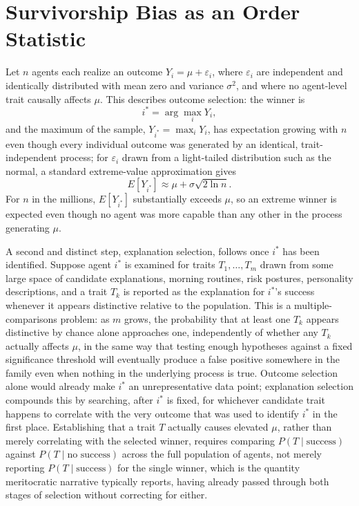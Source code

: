 \documentclass[11pt]{article}
\begin{document}
\section{Survivorship Bias as an Order Statistic}

Let $n$ agents each realize an outcome $Y_i = \mu + \varepsilon_i$, where $\varepsilon_i$ are independent and identically distributed with mean zero and variance $\sigma^2$, and where no agent-level trait causally affects $\mu$. This describes outcome selection: the winner is
\[
i^{*} = \arg\max_i Y_i,
\]
and the maximum of the sample, $Y_{i^{*}} = \max_i Y_i$, has expectation growing with $n$ even though every individual outcome was generated by an identical, trait-independent process; for $\varepsilon_i$ drawn from a light-tailed distribution such as the normal, a standard extreme-value approximation gives
\[
E[Y_{i^{*}}] \approx \mu + \sigma \sqrt{2 \ln n}.
\]
For $n$ in the millions, $E[Y_{i^{*}}]$ substantially exceeds $\mu$, so an extreme winner is expected even though no agent was more capable than any other in the process generating $\mu$.

A second and distinct step, explanation selection, follows once $i^{*}$ has been identified. Suppose agent $i^{*}$ is examined for traits $T_1, \dots, T_m$ drawn from some large space of candidate explanations, morning routines, risk postures, personality descriptions, and a trait $T_k$ is reported as the explanation for $i^{*}$'s success whenever it appears distinctive relative to the population. This is a multiple-comparisons problem: as $m$ grows, the probability that at least one $T_k$ appears distinctive by chance alone approaches one, independently of whether any $T_k$ actually affects $\mu$, in the same way that testing enough hypotheses against a fixed significance threshold will eventually produce a false positive somewhere in the family even when nothing in the underlying process is true. Outcome selection alone would already make $i^{*}$ an unrepresentative data point; explanation selection compounds this by searching, after $i^{*}$ is fixed, for whichever candidate trait happens to correlate with the very outcome that was used to identify $i^{*}$ in the first place. Establishing that a trait $T$ actually causes elevated $\mu$, rather than merely correlating with the selected winner, requires comparing $P(T \mid \text{success})$ against $P(T \mid \text{no success})$ across the full population of agents, not merely reporting $P(T \mid \text{success})$ for the single winner, which is the quantity meritocratic narrative typically reports, having already passed through both stages of selection without correcting for either.
\end{document}
